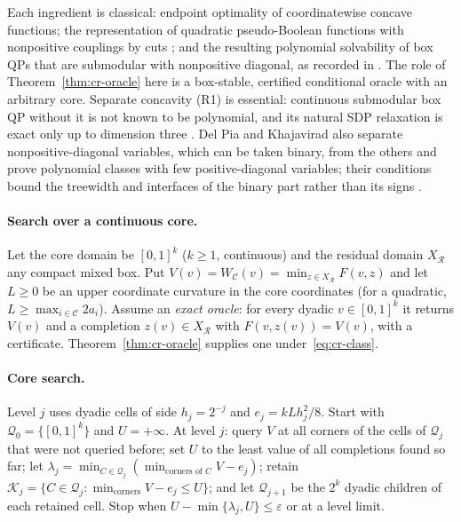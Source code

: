 \begin{remark}\label{rem:cr-cut-prior}
Each ingredient is classical: endpoint optimality of coordinatewise
concave functions; the representation of quadratic pseudo-Boolean
functions with nonpositive couplings by cuts
\cite{Ivanescu1965,PicardRatliff1975,KolmogorovZabih2004}; and the resulting
polynomial solvability of box QPs that are submodular with nonpositive
diagonal, as recorded in \cite{BurerNatarajanWillemsen2026v3}. The role of
Theorem~\ref{thm:cr-oracle} here is a box-stable, certified conditional
oracle with an arbitrary core. Separate concavity (R1) is essential:
continuous submodular box QP without it is not known to be polynomial,
and its natural SDP relaxation is exact only up to dimension three
\cite{BurerNatarajanWillemsen2026v3}. Del Pia and Khajavirad also separate
nonpositive-diagonal variables, which can be taken binary, from the others
and prove polynomial classes with few positive-diagonal variables; their
conditions bound the treewidth and interfaces of the binary part rather
than its signs \cite{DelPiaKhajavirad2026}.
\end{remark}

\paragraph{Search over a continuous core.}\label{sec:cr-search}

Let the core domain be $[0,1]^k$ ($k\ge1$, continuous) and the residual
domain $X_{\mathcal R}$ any compact mixed box. Put
$V(v)=W_{\mathcal C}(v)=\min_{z\in X_{\mathcal R}}F(v,z)$ and let $L\ge0$ be an
upper coordinate curvature in the core coordinates (for a quadratic,
$L\ge\max_{i\in\mathcal C}2a_i$). Assume an \emph{exact oracle}: for every
dyadic $v\in[0,1]^k$ it returns $V(v)$ and a completion $z(v)\in X_{\mathcal R}$
with $F(v,z(v))=V(v)$, with a certificate. Theorem~\ref{thm:cr-oracle}
supplies one under~\eqref{eq:cr-class}.

\paragraph{Core search.}
Level $j$ uses dyadic cells of side $h_j=2^{-j}$ and
$e_j=kLh_j^2/8$. Start with $\mathcal Q_0=\{[0,1]^k\}$ and $U=+\infty$.
At level $j$: query $V$ at all corners of the cells of $\mathcal Q_j$ that
were not queried before; set $U$ to the least value of all completions
found so far; let
$\lambda_j=\min_{C\in\mathcal Q_j}(\min_{\text{corners of }C}V-e_j)$;
retain $\mathcal K_j=\{C\in\mathcal Q_j:\min_{\text{corners}}V-e_j\le U\}$;
and let $\mathcal Q_{j+1}$ be the $2^k$ dyadic children of each retained
cell. Stop when $U-\min\{\lambda_j,U\}\le\varepsilon$ or at a level limit.

